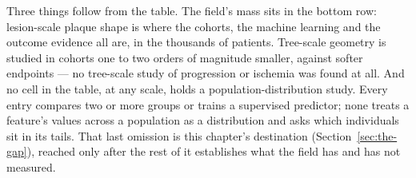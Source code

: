 Three things follow from the table.
The field's mass sits in the bottom row: lesion-scale plaque shape is where the cohorts, the machine
learning and the outcome evidence all are, in the thousands of patients.
Tree-scale geometry is studied in cohorts one to two orders of magnitude smaller, against softer
endpoints --- no tree-scale study of progression or ischemia was found at all.
And no cell in the table, at any scale, holds a population-distribution study.
Every entry compares two or more groups or trains a supervised predictor; none treats a feature's
values across a population as a distribution and asks which individuals sit in its tails.
That last omission is this chapter's destination (Section~\ref{sec:the-gap}), reached only after the
rest of it establishes what the field has and has not measured.
